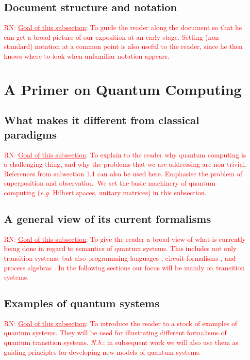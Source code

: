 \documentclass[a4paper, 11pt]{article}
\newcommand{\nevComment}[1]{\textcolor{red}{RN: #1}}
\begin{document}
\subsection{Document structure and notation}

\nevComment{\underline{Goal of this subsection}: To guide the reader
  along the document so that he can get a broad picture of our
  exposition at an early stage. Setting (non-standard) notation at a
  common point is also useful to the reader, since he then knows where
  to look when unfamiliar notation appears.}

\section{A Primer on Quantum Computing}

\subsection{What makes it different from classical paradigms}

\nevComment{\underline{Goal of this subsection}: To explain to the
  reader why quantum computing is a challenging thing, and why the
  problems that we are addressing are non-trivial. References from
  subsection 1.1 can also be used here.  Emphasise the problem of
  superposition and observation. We set the basic machinery of quantum
  computing (\emph{e.g.} Hilbert spaces, unitary matrices) in this subsection.}

\subsection{A general view of its current formalisms}

\nevComment{\underline{Goal of this subsection}: To give the reader a
  broad view of what is currently being done in regard to semantics of
  quantum systems. This includes not only transition systems, but also
  programming languages \cite{selinger04,hasuo17,ying16}, circuit
  formalisms \cite{nielsen2002quantum}, and process algebras
  \cite{jorrand04,ying09}. In the following sections our focus will be
  mainly on transition systems.}

\subsection{Examples of quantum systems}

\nevComment{\underline{Goal of this subsection}: To introduce the
  reader to a stock of examples of quantum systems. They will be used
  for illustrating different formalisms of quantum transition
  systems. \emph{N.b.}: in subsequent work we will also use them as
  guiding principles for developing new models of quantum systems.}
\end{document}

